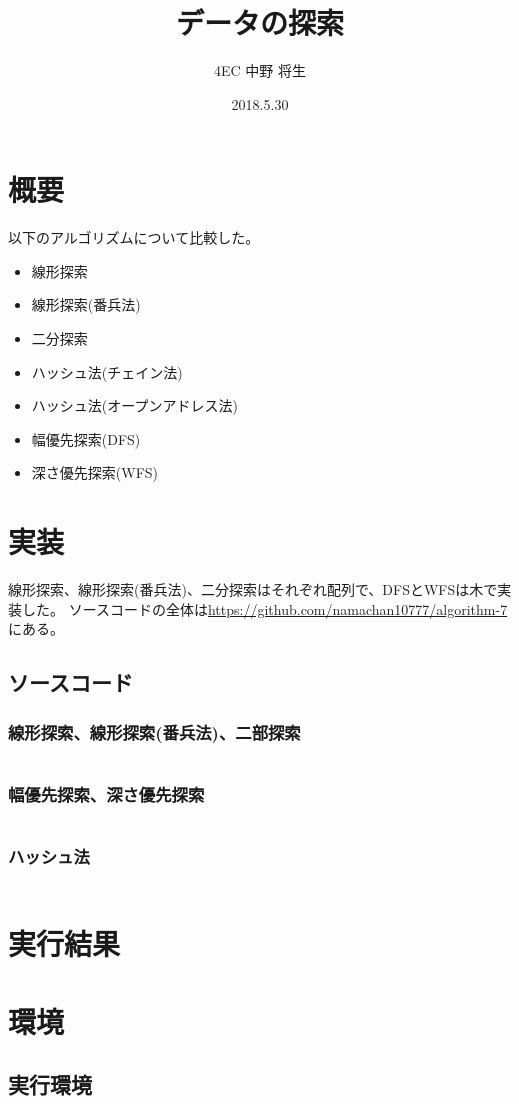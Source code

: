 \documentclass[dvipdfmx]{jsarticle}
\author{4EC 中野 将生}
\date{2018.5.30}
\title{データの探索}
\begin{document}
	\maketitle
	\section{概要}
		以下のアルゴリズムについて比較した。
		\begin{itemize}
			\item 線形探索
			\item 線形探索(番兵法)
			\item 二分探索
			\item ハッシュ法(チェイン法)
			\item ハッシュ法(オープンアドレス法)
			\item 幅優先探索(DFS)
			\item 深さ優先探索(WFS)
		\end{itemize}
	\section{実装}
		線形探索、線形探索(番兵法)、二分探索はそれぞれ配列で、DFSとWFSは木で実装した。
		ソースコードの全体は\url{https://github.com/namachan10777/algorithm-7}にある。
		\subsection{ソースコード}
			\subsubsection{線形探索、線形探索(番兵法)、二部探索}
				\inputminted{d}{./src/algorithms/linear.d}
			\subsubsection{幅優先探索、深さ優先探索}
				\inputminted{d}{./src/algorithms/tree.d}
			\subsubsection{ハッシュ法}
				\inputminted{d}{./src/algorithms/hash.d}
	\section{実行結果}
	\section{環境}
		\subsection{実行環境}
\end{document}
